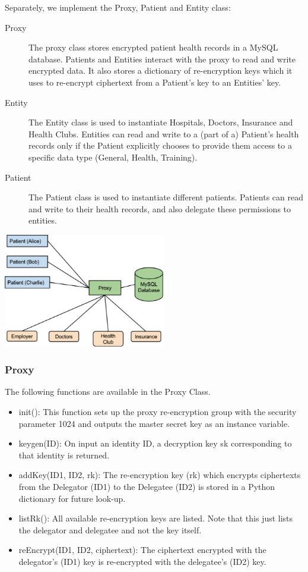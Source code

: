 \documentclass[]{article}
\begin{document}
\begin{itemize}
Separately, we implement the Proxy, Patient and Entity class:
\begin{description}
\item[Proxy] The proxy class stores encrypted patient health records in a MySQL database. Patients and Entities interact with the proxy to read and write encrypted data. It also stores a dictionary of re-encryption keys which it uses to re-encrypt ciphertext from a Patient's key to an Entities’ key.
\item[Entity] The Entity class is used to instantiate Hospitals, Doctors, Insurance and Health Clubs. Entities can read and write to a (part of a) Patient's health records only if the Patient explicitly chooses to provide them access to a specific data type (General, Health, Training).
\item[Patient] The Patient class is used to instantiate different patients. Patients can read and write to their health records, and also delegate these permissions to entities.
\end{description}

\includegraphics[width=200pt]{implementationmodel.png}

\subsubsection{Proxy}
The following functions are available in the Proxy Class. 

\begin{itemize}
\item init(): This function sets up the proxy re-encryption group with the security parameter 1024 and outputs the master secret key as an instance variable.
\item keygen(ID): On input an identity ID, a decryption key sk corresponding to that identity is returned.
\item addKey(ID1, ID2, rk): The re-encryption key (rk) which encrypts ciphertexts from the Delegator (ID1) to the Delegatee (ID2) is stored in a Python dictionary for future look-up.
\item listRk(): All available re-encryption keys are listed. Note that this just lists the delegator and delegatee and not the key itself.
\item reEncrypt(ID1, ID2, ciphertext): The ciphertext encrypted with the delegator's (ID1) key is re-encrypted with the delegatee's (ID2) key.
\end{itemize}

\end{itemize}
\end{document}
